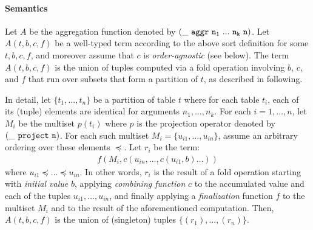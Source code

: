 \documentclass[english,a4paper,10pt]{article}
\begin{document}
\paragraph{Semantics}
Let $A$ be the aggregation function
denoted by $
{\tt (\_\ aggr\ n_1\ ...\ n_k\ n)}$.
Let $A( t, b, c, f)$ be a well-typed term
according to the above sort definition for some $t, b, c, f$,
and moreover assume that $c$ is \emph{order-agnostic} (see below).
The term $A( t, b, c, f)$ is
the union of tuples computed via a fold operation involving $b$, $c$, and $f$
that run over subsets that form a partition of $t$, as described in following.

In detail,
let $\{ t_1, \ldots, t_n \}$ be a partition of table $t$
where for each table $t_i$, each of its (tuple) elements
are identical for arguments $n_1, \ldots, n_k$.
For each $i = 1, \ldots, n$,
let $M_i$ be the multiset $p(t_i)$
where $p$ is the projection operator denoted by ${\tt (\_\ project\ n)}$.
For each such multiset $M_i = \{ u_{i1}, \ldots, u_{in} \}$,
assume an arbitrary ordering over these elements $\preceq$.
Let $r_i$ be the term:
\begin{align*}
f( M_i, c( u_{in}, \ldots, c( u_{i1}, b ) \ldots ) )
\end{align*}
where $u_{i1} \preceq \ldots \preceq u_{in}$.
In other words,
$r_i$ is the result of a fold operation
starting with \emph{initial value} $b$,
applying \emph{combining function} $c$ to
the accumulated value and each of the tuples $u_{i1}, \ldots, u_{in}$,
and finally applying a \emph{finalization} function $f$
to the multiset $M_i$ and to the result of the aforementioned computation.
Then,
$A( t, b, c, f)$ is
the union of (singleton) tuples $\{ (r_1), \ldots, (r_n) \}$.
\end{document}
